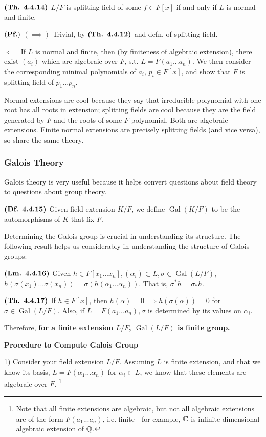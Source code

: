 \documentclass{article}
\DeclareMathOperator{\Gal}{Gal}
\begin{document}
 $\textbf{(Th. 4.4.14)}$ $L/F$ is splitting field of some $f \in F[x]$ if and only if $L$ is normal and finite.
 
 $(\textbf{Pf.})$ $(\implies)$ Trivial, by $\textbf{(Th. 4.4.12)}$ and defn. of splitting field.
 
 $\impliedby$ If $L$ is normal and finite, then (by finiteness of algebraic extension), there exist $(a_i)$ which are algebraic over $F$, s.t. $L = F(a_1...a_n)$. We then consider the corresponding minimal polynomials of $a_i$, $p_i \in F[x]$, and show that $F$ is splitting field of $p_1...p_n$.

 Normal extensions are cool because they say that irreducible polynomial with one root has all roots in extension; splitting fields are cool because they are the field generated by $F$ and the roots of some $F$-polynomial. Both are algebraic extensions. Finite normal extensions are precisely splitting fields (and vice versa), so share the same theory.

 \subsubsection*{Galois Theory}

Galois theory is very useful because it helps convert questions about field theory to questions about group theory. 

$\textbf{(Df. 4.4.15)}$ Given field extension $K/F$, we define $\Gal(K/F)$ to be the automorphisms of $K$ that fix $F$.

Determining the Galois group is crucial in understanding its structure. The following result helps us considerably in understanding the structure of Galois groups:

$\textbf{(Lm. 4.4.16)}$ Given $h \in F[x_1...x_n], (\alpha_i) \subset L, \sigma \in \Gal(L/F)$, $h(\sigma(x_1)...\sigma(x_n)) = \sigma(h(\alpha_1...\alpha_n))$. That is, $\sigma^*h = \sigma_* h$.

$\textbf{(Th. 4.4.17)}$ If $h \in F[x]$, then $h(\alpha) = 0 \implies h(\sigma(\alpha)) = 0$ for $\sigma \in \Gal(L/F)$. Also, if $L = F(a_1...a_n), \sigma$ is determined by its values on $\alpha_i$.

Therefore, \textbf{for a finite extension $L/F$, $\Gal(L/F)$ is finite group.}

\textbf{Procedure to Compute Galois Group}

1) Consider your field extension $L/F$. Assuming $L$ is finite extension, and that we know its basis, $L = F(\alpha_1...\alpha_n)$ for $\alpha_i \subset L$, we know that these elements are algebraic over $F$. \footnote{Note that all finite extensions are algebraic, but not all algebraic extensions are of the form $F(a_1...a_n)$, i.e. finite - for example, $\mathbb{C}$ is infinite-dimensional algebraic extension of $\mathbb{Q}$.}
\end{document}

